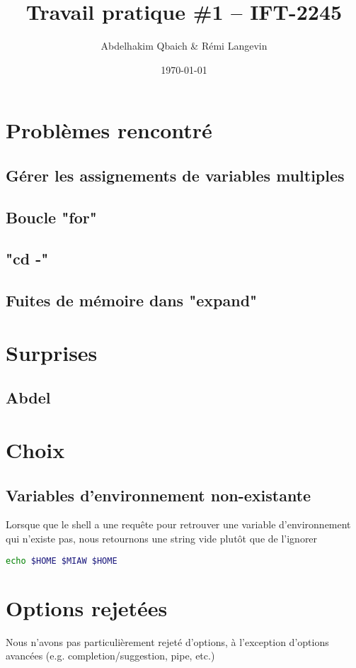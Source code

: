 \documentclass[a4paper]{article}
\title{Travail pratique \#1 -- IFT-2245}
\author{Abdelhakim Qbaich & Rémi Langevin}
\date{\today}
\begin{document}
\maketitle

\section*{Probl\`emes rencontr\'e}
    \subsection*{G\'erer les assignements de variables multiples}
    \subsection*{Boucle "for"}
    \subsection*{"cd -"}
    \subsection*{Fuites de m\'emoire dans "expand"}

\section*{Surprises}
    \subsection*{Abdel}

\section*{Choix}
    \subsection*{Variables d'environnement non-existante}
    Lorsque que le shell a une requ\^ete pour retrouver une variable
    d'environnement qui n'existe pas, nous retournons une string vide plut\^ot
    que de l'ignorer
        \begin{lstlisting}[language=bash]
        echo $HOME $MIAW $HOME
        \end{lstlisting}

\section*{Options rejet\'ees}
    Nous n'avons pas particuli\`erement rejet\'e d'options, \`a
    l'exception d'options avanc\'ees (e.g. completion/suggestion, pipe, etc.)
\end{document}
